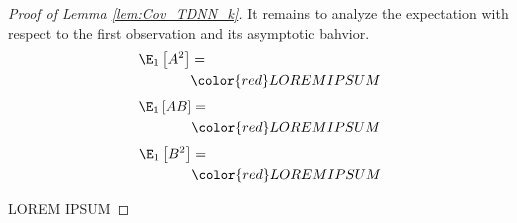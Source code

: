 \begin{proof}[Proof of Lemma \ref{lem:Cov_TDNN_k}]
	It remains to analyze the expectation with respect to the first observation and its asymptotic bahvior.
	\begin{equation}
		\begin{aligned}
			\E_{1}\left[A^2\right]
			 & =                         \\
			 & {\color{red} LOREM IPSUM}
		\end{aligned}
	\end{equation}
	\begin{equation}
		\begin{aligned}
			\E_{1}\left[AB\right]
			 & =                         \\
			 & {\color{red} LOREM IPSUM}
		\end{aligned}
	\end{equation}
	\begin{equation}
		\begin{aligned}
			\E_{1}\left[B^2\right]
			 & =                         \\
			 & {\color{red} LOREM IPSUM}
		\end{aligned}
	\end{equation}

	{\color{red} LOREM IPSUM}
\end{proof}